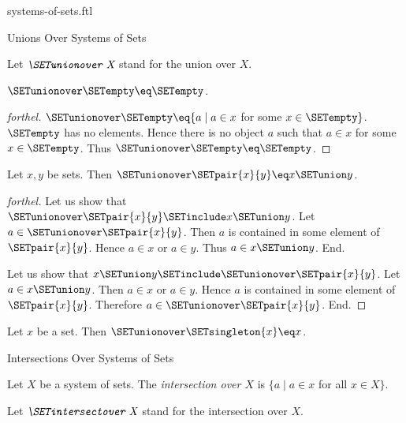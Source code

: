 \documentclass{naproche-library}
\begin{document}
\begin{smodule}[title=Systems of Sets]{systems-of-sets.ftl}
\begin{sfragment}{Unions Over Systems of Sets}
\begin{definition}[forthel,id=FOUNDATIONS_10_541772562300928]
    Let $\emph{\SETunionover X}$ stand for the union over $X$.
  \end{definition}

  \begin{proposition}[forthel,id=FOUNDATIONS_10_4872701241982976]
    $\SETunionover \SETempty \eq \SETempty$.
  \end{proposition}
  \begin{proof}[forthel]
    $\SETunionover \SETempty \eq \{ a \mid a \in x$ for some $x \in \SETempty \}$.
    $\SETempty$ has no elements.
    Hence there is no object $a$ such that $a \in x$ for some $x \in \SETempty$.
    Thus $\SETunionover \SETempty \eq \SETempty$.
  \end{proof}

  \begin{proposition}[forthel,id=FOUNDATIONS_10_2559541585641472]
    Let $x, y$ be sets.
    Then $\SETunionover \SETpair{x}{y} \eq x \SETunion y$.
  \end{proposition}
  \begin{proof}[forthel]
    Let us show that $\SETunionover \SETpair{x}{y} \SETinclude x \SETunion y$.
      Let $a \in \SETunionover \SETpair{x}{y}$.
      Then $a$ is contained in some element of $\SETpair{x}{y}$.
      Hence $a \in x$ or $a \in y$.
      Thus $a \in x \SETunion y$.
    End.

    Let us show that $x \SETunion y \SETinclude \SETunionover \SETpair{x}{y}$.
      Let $a \in x \SETunion y$.
      Then $a \in x$ or $a \in y$.
      Hence $a$ is contained in some element of $\SETpair{x}{y}$.
      Therefore $a \in \SETunionover \SETpair{x}{y}$.
    End.
  \end{proof}

  \begin{corollary}[forthel,id=FOUNDATIONS_10_2157223832715264]
    Let $x$ be a set.
    Then $\SETunionover \SETsingleton{x} \eq x$.
  \end{corollary}
\end{sfragment}

\begin{sfragment}{Intersections Over Systems of Sets}
  \begin{definition}[forthel,id=FOUNDATIONS_10_2659345095458816]
    Let $X$ be a system of sets.
    The \emph{intersection over $X$} is $\{ a \mid a \in x$ for all $x \in X \}$.

    Let $\emph{\SETintersectover X}$ stand for the intersection over $X$.
  \end{definition}


\end{sfragment}
\end{smodule}
\end{document}
